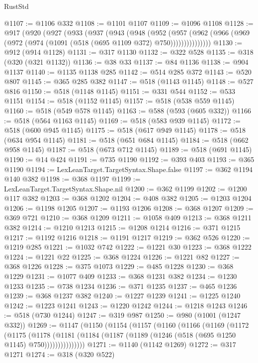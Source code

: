 \begin{lexlean}{RustStd}
\begin{coremodule}
@1107 := @1106 @332
@1108 := @1101 @1107
@1109 := @1096 @1108
@1128 := @917
    (@920
      (@927
        (@933
          (@937
            (@943
              (@948
                (@952
                  (@957
                    (@962 (@966 (@969 (@972 (@974 (@1091 (@518 (@695 @1109 @372) @750)))))))))))))))
@1130 := @912 (@914 @1128)
@1131 := @317 @1130
@1132 := @322 @528
@1135 := @318 (@320 (@321 @1132))
@1136 := @38 @33
@1137 := @84 @1136
@1138 := @904 @1137
@1140 := @1135 @1138 @285
@1142 := @514 @285 @372
@1143 := @520 @807
@1145 := @365 @285 @382
@1147 := @518 (@1143 @1145)
@1148 := @527 @816
@1150 := @518 (@1148 @1145)
@1151 := @331 @544
@1152 := @533 @1151
@1154 := @518 (@1152 @1145)
@1157 := @518 (@538 @559 @1145)
@1160 := @518 (@549 @578 @1145)
@1163 := @588 (@593 (@605 @332))
@1166 := @518 (@564 @1163 @1145)
@1169 := @518 (@583 @939 @1145)
@1172 := @518 (@600 @945 @1145)
@1175 := @518 (@617 @949 @1145)
@1178 := @518 (@634 @954 @1145)
@1181 := @518 (@651 @684 @1145)
@1184 := @518 (@662 @958 @1145)
@1187 := @518 (@673 @712 @1145)
@1189 := @518 (@691 @1145)
@1190 := @14 @424
@1191 := @735 @1190
@1192 := @393 @403
@1193 := @365 @1190
@1194 := LexLeanTarget.TargetSyntax.Shape.false
@1197 := @362 @1194 @140 @382
@1198 := @368 @1197
@1199 := LexLeanTarget.TargetSyntax.Shape.nil
@1200 := @362 @1199
@1202 := @1200 @117 @382
@1203 := @368 @1202
@1204 := @408 @382
@1205 := @1203 @1204
@1206 := @1198 @1205
@1207 := @1193 @1206
@1208 := @368 @1207
@1209 := @369 @721
@1210 := @368 @1209
@1211 := @1058 @409
@1213 := @368 @1211 @382
@1214 := @1210 @1213
@1215 := @1208 @1214
@1216 := @371 @1215
@1217 := @1192 @1216
@1218 := @1191 @1217
@1219 := @362 @526
@1220 := @1219 @285
@1221 := @1032 @742
@1222 := @1221 @30
@1223 := @368 @1222
@1224 := @1221 @22
@1225 := @368 @1224
@1226 := @1221 @82
@1227 := @368 @1226
@1228 := @375 @1073
@1229 := @485 @1228
@1230 := @368 @1229
@1231 := @1077 @409
@1233 := @368 @1231 @382
@1234 := @1230 @1233
@1235 := @738 @1234
@1236 := @371 @1235
@1237 := @465 @1236
@1239 := @368 @1237 @382
@1240 := @1227 @1239
@1241 := @1225 @1240
@1242 := @1223 @1241
@1243 := @1220 @1242
@1244 := @1218 @1243
@1246 := @518 (@730 @1244)
@1247 := @319 @987
@1250 := @980 (@1001 (@1247 @332))
@1269 := @1147
    (@1150
      (@1154
        (@1157
          (@1160
            (@1166
              (@1169
                (@1172
                  (@1175
                    (@1178
                      (@1181
                        (@1184 (@1187 (@1189 (@1246 (@518 (@695 @1250 @1145) @750)))))))))))))))
@1271 := @1140 (@1142 @1269)
@1272 := @317 @1271
@1274 := @318 (@320 @522)

\end{coremodule}
\end{lexlean}
